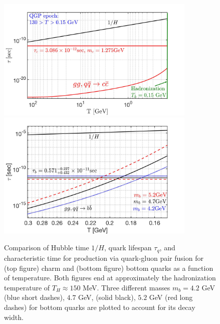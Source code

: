 \begin{figure} %
    \centering
    \includegraphics[width=0.85\textwidth]{./plots/CharmQuark_QGP.jpg}
    \includegraphics[width=0.85\textwidth]{./plots/BQuarkReactionTime_bottom.jpg}
    \caption{Comparison of Hubble time $1/H$, quark lifespan $\tau_{q}$, and characteristic time for production via quark-gluon pair fusion for (top figure) charm and (bottom figure) bottom quarks as a function of temperature. Both figures end at approximately the hadronization temperature of $T_{H}\approx150$ MeV. Three different masses $m_{b}=4.2$ GeV (blue short dashes), $4.7$ GeV, (solid black), $5.2$ GeV (red long dashes) for bottom quarks are plotted to account for its decay width.}
\label{BCreaction_fig}
\end{figure}



